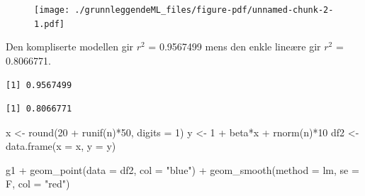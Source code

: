 \documentclass[
  letterpaper,
  DIV=11,
  numbers=noendperiod]{scrreprt}
\newenvironment{Shaded}{\begin{snugshade}}{\end{snugshade}}
\newcommand{\AttributeTok}[1]{\textcolor[rgb]{0.40,0.45,0.13}{#1}}
\newcommand{\DecValTok}[1]{\textcolor[rgb]{0.68,0.00,0.00}{#1}}
\newcommand{\FunctionTok}[1]{\textcolor[rgb]{0.28,0.35,0.67}{#1}}
\newcommand{\NormalTok}[1]{\textcolor[rgb]{0.00,0.23,0.31}{#1}}
\newcommand{\OtherTok}[1]{\textcolor[rgb]{0.00,0.23,0.31}{#1}}
\newcommand{\SpecialCharTok}[1]{\textcolor[rgb]{0.37,0.37,0.37}{#1}}
\newcommand{\StringTok}[1]{\textcolor[rgb]{0.13,0.47,0.30}{#1}}
\theoremstyle{definition}
\theoremstyle{remark}
\begin{document}
\begin{figure}[H]

{\centering \texttt{[image: ./grunnleggendeML\_files/figure-pdf/unnamed-chunk-2-1.pdf]}

}

\end{figure}

Den kompliserte modellen gir \(r^2\) = 0.9567499 mens den enkle lineære
gir \(r^2\) = 0.8066771.

\begin{Shaded}
\end{Shaded}

\begin{verbatim}
[1] 0.9567499
\end{verbatim}

\begin{Shaded}
\end{Shaded}

\begin{verbatim}
[1] 0.8066771
\end{verbatim}

\begin{Shaded}
\begin{Highlighting}[]
\NormalTok{x }\OtherTok{\textless{}{-}} \FunctionTok{round}\NormalTok{(}\DecValTok{20} \SpecialCharTok{+} \FunctionTok{runif}\NormalTok{(n)}\SpecialCharTok{*}\DecValTok{50}\NormalTok{, }\AttributeTok{digits =} \DecValTok{1}\NormalTok{)}
\NormalTok{y }\OtherTok{\textless{}{-}} \DecValTok{1} \SpecialCharTok{+}\NormalTok{ beta}\SpecialCharTok{*}\NormalTok{x }\SpecialCharTok{+} \FunctionTok{rnorm}\NormalTok{(n)}\SpecialCharTok{*}\DecValTok{10}
\NormalTok{df2 }\OtherTok{\textless{}{-}} \FunctionTok{data.frame}\NormalTok{(}\AttributeTok{x =}\NormalTok{ x, }\AttributeTok{y =}\NormalTok{ y)}
  
\NormalTok{g1 }\SpecialCharTok{+}
  \FunctionTok{geom\_point}\NormalTok{(}\AttributeTok{data =}\NormalTok{ df2, }\AttributeTok{col =} \StringTok{"blue"}\NormalTok{) }\SpecialCharTok{+}
  \FunctionTok{geom\_smooth}\NormalTok{(}\AttributeTok{method =}\NormalTok{ lm, }\AttributeTok{se =}\NormalTok{ F, }\AttributeTok{col =} \StringTok{"red"}\NormalTok{)}
\end{Highlighting}
\end{Shaded}
\end{document}

